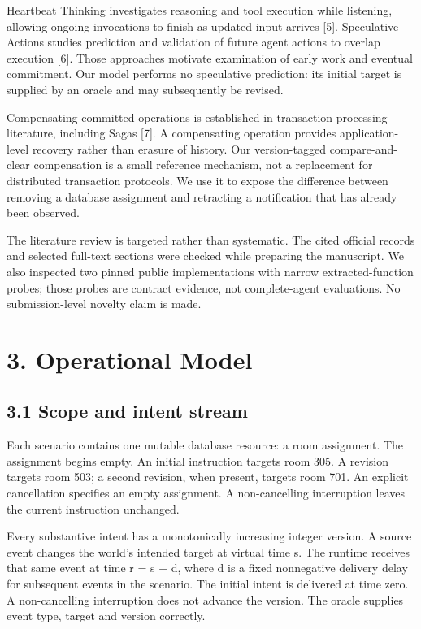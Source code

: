 \documentclass[10pt]{article}
\begin{document}
Heartbeat Thinking investigates reasoning and tool execution while listening, allowing ongoing invocations to finish as updated input arrives [5]. Speculative Actions studies prediction and validation of future agent actions to overlap execution [6]. Those approaches motivate examination of early work and eventual commitment. Our model performs no speculative prediction: its initial target is supplied by an oracle and may subsequently be revised.


Compensating committed operations is established in transaction-processing literature, including Sagas [7]. A compensating operation provides application-level recovery rather than erasure of history. Our version-tagged compare-and-clear compensation is a small reference mechanism, not a replacement for distributed transaction protocols. We use it to expose the difference between removing a database assignment and retracting a notification that has already been observed.


The literature review is targeted rather than systematic. The cited official records and selected full-text sections were checked while preparing the manuscript. We also inspected two pinned public implementations with narrow extracted-function probes; those probes are contract evidence, not complete-agent evaluations. No submission-level novelty claim is made.


\section*{3. Operational Model}

\subsection*{3.1 Scope and intent stream}

Each scenario contains one mutable database resource: a room assignment. The assignment begins empty. An initial instruction targets room 305. A revision targets room 503; a second revision, when present, targets room 701. An explicit cancellation specifies an empty assignment. A non-cancelling interruption leaves the current instruction unchanged.


Every substantive intent has a monotonically increasing integer version. A source event changes the world's intended target at virtual time s. The runtime receives that same event at time r = s + d, where d is a fixed nonnegative delivery delay for subsequent events in the scenario. The initial intent is delivered at time zero. A non-cancelling interruption does not advance the version. The oracle supplies event type, target and version correctly.
\end{document}
